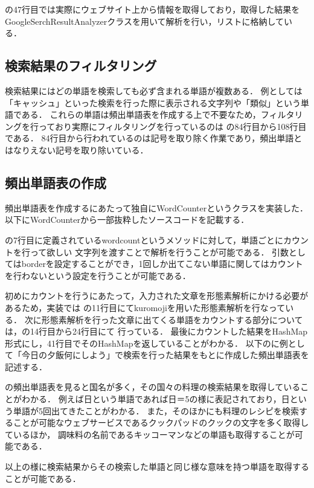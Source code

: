 の47行目では実際にウェブサイト上から情報を取得しており，取得した結果を
GoogleSerchResultAnalyzerクラスを用いて解析を行い，リストに格納している．

\subsection{検索結果のフィルタリング}
検索結果にはどの単語を検索しても必ず含まれる単語が複数ある．
例としては「キャッシュ」といった検索を行った際に表示される文字列や「類似」という単語である．
これらの単語は頻出単語表を作成する上で不要なため，フィルタリングを行っており実際にフィルタリングを行っているのは
の84行目から108行目である．
84行目から行われているのは記号を取り除く作業であり，頻出単語とはなりえない記号を取り除いている．

\subsection{頻出単語表の作成}
頻出単語表を作成するにあたって独自にWordCounterというクラスを実装した．
以下にWordCounterから一部抜粋したソースコードを記載する．


の7行目に定義されているwordcountというメソッドに対して，単語ごとにカウントを行って欲しい
文字列を渡すことで解析を行うことが可能である．
引数としてはborderを設定することができ，1回しか出てこない単語に関してはカウントを行わないという設定を行うことが可能である．

初めにカウントを行うにあたって，入力された文章を形態素解析にかける必要があるため，実装では
の11行目にてkuromojiを用いた形態素解析を行なっている．
次に形態素解析を行った文章に出てくる単語をカウントする部分については，の14行目から24行目にて
行っている．
最後にカウントした結果をHashMap形式にし，41行目でそのHashMapを返していることがわかる．
以下のに例として「今日の夕飯何にしよう」で検索を行った結果をもとに作成した頻出単語表を記述する．


の頻出単語表を見ると国名が多く，その国々の料理の検索結果を取得していることがわかる．
例えば日という単語であれば日＝5の様に表記されており，日という単語が5回出てきたことがわかる．
また，そのほかにも料理のレシピを検索することが可能なウェブサービスであるクックパッドのクックの文字を多く取得しているほか，
調味料の名前であるキッコーマンなどの単語も取得することが可能である．

以上の様に検索結果からその検索した単語と同じ様な意味を持つ単語を取得することが可能である．

